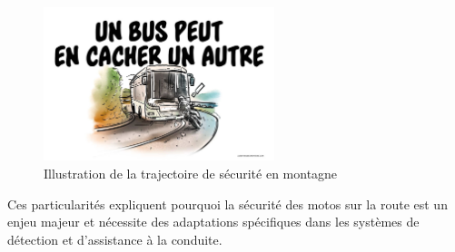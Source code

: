 \begin{figure}[H]
    \centering
    \includegraphics[width=0.6\textwidth]{etat_art/images/trajectoire-route-voie-bus-conduite_hd.jpg} 
    \caption{Illustration de la trajectoire de sécurité en montagne}
\end{figure}


\vspace{0.5cm} %
Ces particularités expliquent pourquoi la sécurité des motos sur la route est un enjeu majeur et nécessite des adaptations spécifiques dans les systèmes de détection et d’assistance à la conduite. 

